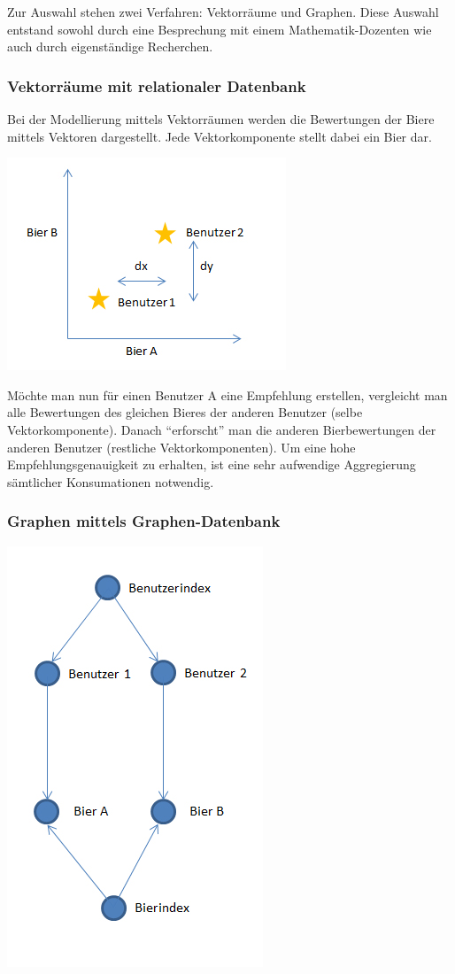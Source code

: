 \documentclass[10pt,a4paper]{scrartcl}
\begin{document}
Zur Auswahl stehen zwei Verfahren: Vektorräume und Graphen. Diese Auswahl entstand
sowohl durch eine Besprechung mit einem Mathematik-Dozenten wie auch durch
eigenständige Recherchen.

\subsubsection{Vektorräume mit relationaler Datenbank}

Bei der Modellierung mittels Vektorräumen werden die Bewertungen der Biere mittels Vektoren
dargestellt. Jede Vektorkomponente stellt dabei ein Bier dar.

\includegraphics[scale=1]{vektor.jpg} 

Möchte man nun für einen Benutzer A eine Empfehlung erstellen, vergleicht man alle Bewertungen des
gleichen Bieres der anderen Benutzer (selbe Vektorkomponente). Danach "`erforscht"' man die anderen
Bierbewertungen der anderen Benutzer (restliche Vektorkomponenten). Um eine hohe
Empfehlungsgenauigkeit zu erhalten, ist eine sehr aufwendige Aggregierung sämtlicher Konsumationen
notwendig.

\subsubsection{Graphen mittels Graphen-Datenbank}

\includegraphics[scale=0.7]{graph.jpg} 
\end{document}
